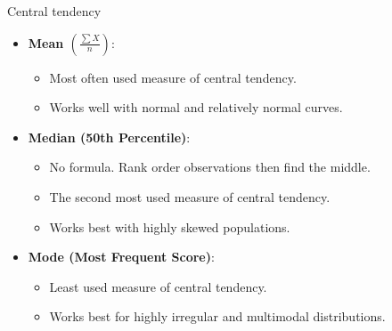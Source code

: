 \documentclass[
  ignorenonframetext,
]{beamer}
\providecommand{\tightlist}{%
  \setlength{\itemsep}{0pt}\setlength{\parskip}{0pt}}
\begin{document}
\begin{frame}{Central tendency}
\label{central-tendency}
\begin{itemize}
\tightlist
\item
  \textbf{Mean \(\left( \frac{\sum X}{n} \right)\)}:

  \begin{itemize}
  \tightlist
  \item
    Most often used measure of central tendency.
  \item
    Works well with normal and relatively normal curves.
  \end{itemize}
\end{itemize}

\begin{itemize}
\tightlist
\item
  \textbf{Median (50th Percentile)}:

  \begin{itemize}
  \tightlist
  \item
    No formula. Rank order observations then find the middle.
  \item
    The second most used measure of central tendency.
  \item
    Works best with highly skewed populations.
  \end{itemize}
\end{itemize}

\begin{itemize}
\tightlist
\item
  \textbf{Mode (Most Frequent Score)}:

  \begin{itemize}
  \tightlist
  \item
    Least used measure of central tendency.
  \item
    Works best for highly irregular and multimodal distributions.
  \end{itemize}
\end{itemize}
\end{frame}
\end{document}
